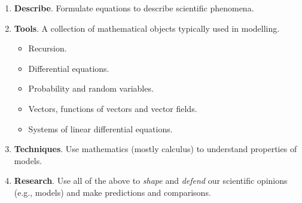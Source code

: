 \documentclass[../main.tex]{subfiles}
\begin{document}
\begin{enumerate}
  \item \textbf{Describe}. Formulate equations to describe scientific phenomena.

  \item \textbf{Tools}. A collection of mathematical objects typically used in modelling.
    \begin{itemize}
      \item Recursion.
      \item Differential equations.
      \item Probability and random variables.
      \item Vectors, functions of vectors and vector fields.
      \item Systems of linear differential equations.
    \end{itemize}

  \item \textbf{Techniques}. Use mathematics (mostly calculus) to understand properties of models.

  \item \textbf{Research}. Use all of the above to \emph{shape} and \emph{defend} our scientific opinions (e.g., models) and make predictions and comparisons.
\end{enumerate}
\end{document}
